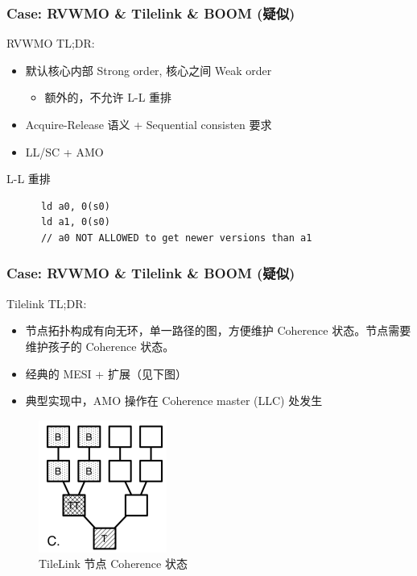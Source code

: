 \documentclass[UTF-8]{ctexbeamer}
\begin{document}
\begin{frame}[fragile]
  \frametitle{Case: RVWMO \& Tilelink \& BOOM (疑似)}

  RVWMO TL;DR:
  \begin{itemize}
    \item 默认核心内部 Strong order, 核心之间 Weak order
    \begin{itemize}
      \item 额外的，不允许 L-L 重排
    \end{itemize}
    \item Acquire-Release 语义 + Sequential consisten 要求
    \item LL/SC + AMO
  \end{itemize}

  \begin{block}{L-L 重排}
    \begin{verbatim}
      ld a0, 0(s0)
      ld a1, 0(s0)
      // a0 NOT ALLOWED to get newer versions than a1
    \end{verbatim}
  \end{block}
\end{frame}

\begin{frame}
  \frametitle{Case: RVWMO \& Tilelink \& BOOM (疑似)}

  Tilelink TL;DR:
  \begin{itemize}
    \item 节点拓扑构成有向无环，单一路径的图，方便维护 Coherence 状态。节点需要维护孩子的 Coherence 状态。
    \item 经典的 MESI + 扩展（见下图）
    \item 典型实现中，AMO 操作在 Coherence master (LLC) 处发生
  \end{itemize}

  \begin{figure}
    \includegraphics{assets/tilelink.png}
    \caption{TileLink 节点 Coherence 状态}
  \end{figure}
\end{frame}
\end{document}
